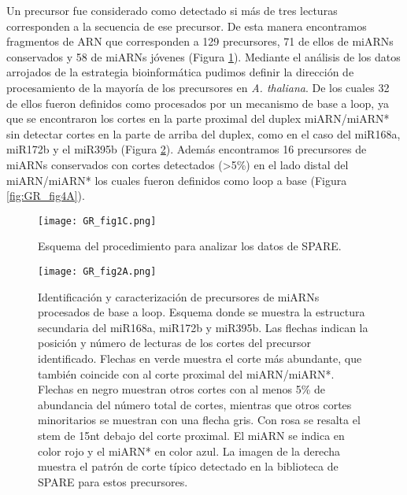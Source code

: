 Un precursor fue considerado como detectado si más de tres lecturas corresponden a la secuencia de ese precursor.
De esta manera encontramos fragmentos de ARN que corresponden a 129 precursores, 71 de ellos de miARNs conservados y 58 de miARNs jóvenes (Figura \ref{fig:GR_fig1C}).
Mediante el análisis de los datos arrojados de la estrategia bioinformática pudimos definir la dirección de procesamiento de la mayoría de los precursores en \textit{A. thaliana}.
De los cuales 32 de ellos fueron definidos como procesados por un mecanismo de base a loop, ya que se encontraron los cortes en la parte proximal del duplex miARN/miARN* sin detectar cortes en la parte de arriba del duplex, como en el caso del miR168a, miR172b y el miR395b (Figura \ref{fig:GR_fig2A}).
Además encontramos 16 precursores de miARNs conservados con cortes detectados (>5\%) en el lado distal del miARN/miARN* los cuales fueron definidos como loop a base (Figura \ref{fig:GR_fig4A}).

\begin{figure}[htbp!] 
    \centering    
    \texttt{[image: GR\_fig1C.png]}
    \caption[Esquema del procedimiento para analizar los datos de SPARE]{Esquema del procedimiento para analizar los datos de SPARE.}
    \label{fig:GR_fig1C}
\end{figure}

\begin{figure}[htbp!] 
    \centering    
    \texttt{[image: GR\_fig2A.png]}
    \caption[Identificación y caracterización de precursores de miARNs procesados de base a loop]{Identificación y caracterización de precursores de miARNs procesados de base a loop.
            Esquema donde se muestra la estructura secundaria del miR168a, miR172b y miR395b.
            Las flechas indican la posición y número de lecturas de los cortes del precursor identificado.
            Flechas en verde muestra el corte más abundante, que también coincide con al corte proximal del miARN/miARN*.
            Flechas en negro muestran otros cortes con al menos 5\% de abundancia del número total de cortes, mientras que otros cortes minoritarios se muestran con una flecha gris.
            Con rosa se resalta el stem de 15nt debajo del corte proximal.
            El miARN se indica en color rojo y el miARN* en color azul.
            La imagen de la derecha muestra el patrón de corte típico detectado en la biblioteca de SPARE para estos precursores.}
    \label{fig:GR_fig2A}
\end{figure}


